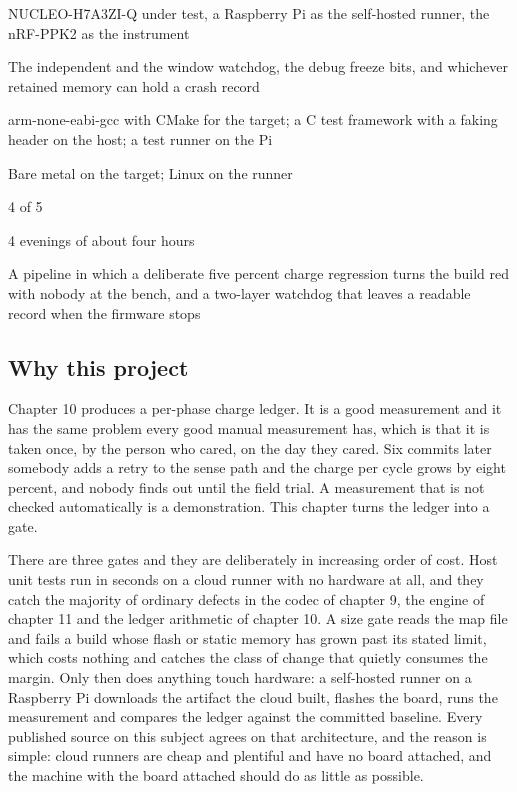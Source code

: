 
\begin{keyfacts}
\item[Board] NUCLEO-H7A3ZI-Q under test, a Raspberry Pi as the self-hosted runner, the nRF-PPK2 as the instrument
\item[Peripherals] The independent and the window watchdog, the debug freeze bits, and whichever retained memory can hold a crash record
\item[Toolchain] arm-none-eabi-gcc with CMake for the target; a C test framework with a faking header on the host; a test runner on the Pi
\item[Operating system] Bare metal on the target; Linux on the runner
\item[Difficulty] 4 of 5
\item[Effort] 4 evenings of about four hours
\item[Deliverable] A pipeline in which a deliberate five percent charge regression turns the build red with nobody at the bench, and a two-layer watchdog that leaves a readable record when the firmware stops
\end{keyfacts}

\subsection*{Why this project}

Chapter 10 produces a per-phase charge ledger. It is a good measurement and it
has the same problem every good manual measurement has, which is that it is
taken once, by the person who cared, on the day they cared. Six commits later
somebody adds a retry to the sense path and the charge per cycle grows by eight
percent, and nobody finds out until the field trial. A measurement that is not
checked automatically is a demonstration. This chapter turns the ledger into a
gate.

There are three gates and they are deliberately in increasing order of cost.
Host unit tests run in seconds on a cloud runner with no hardware at all, and
they catch the majority of ordinary defects in the codec of chapter 9, the
engine of chapter 11 and the ledger arithmetic of chapter 10. A size gate reads
the map file and fails a build whose flash or static memory has grown past its
stated limit, which costs nothing and catches the class of change that quietly
consumes the margin. Only then does anything touch hardware: a self-hosted
runner on a Raspberry Pi downloads the artifact the cloud built, flashes the
board, runs the measurement and compares the ledger against the committed
baseline. Every published source on this subject agrees on that architecture,
and the reason is simple: cloud runners are cheap and plentiful and have no
board attached, and the machine with the board attached should do as little as
possible.

